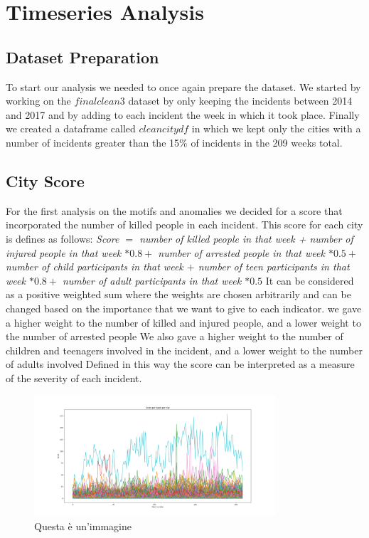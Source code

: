 \chapter{Timeseries Analysis}


\section{Dataset Preparation}

To start our analysis we needed to once again prepare the dataset.
We started by working on the $final clean 3$ dataset by only keeping the incidents between 2014 and 2017 and by adding to each incident the week in which it took place.
Finally we created a dataframe called $clean city df$ in which we kept only the cities with a number of incidents greater than the 15$\%$ of incidents in the 209 weeks total.

\section{City Score}

For the first analysis on the motifs and anomalies we decided for a score that incorporated the number of killed people in each incident.
This score for each city is defines as follows:
\textit{Score $=$ number of killed people in that week + number of injured people in that week $* 0.8 +$ number of arrested people in that week $* 0.5 +$  number of child participants in that week $+$ number of teen participants in that week $* 0.8 +$ number of adult participants in that week $* 0.5$}
It can be considered as a positive weighted sum where the weights are chosen arbitrarily and can be changed based on the importance that we want to give to each indicator.
we gave a higher weight to the number of killed and injured people, and a lower weight to the number of arrested people
We also gave a higher weight to the number of children and teenagers involved in the incident, and a lower weight to the number of adults involved
Defined in this way the score can be interpreted as a measure of the severity of each incident.

\begin{figure}[ht]
    \centering
    \includegraphics[width= 0.8\textwidth]{images/Capitolo1/score_per_week_per_city.png} 
    \caption{Questa è un'immagine} 
    \label{fig:score_per_week_per_city}
\end{figure}

